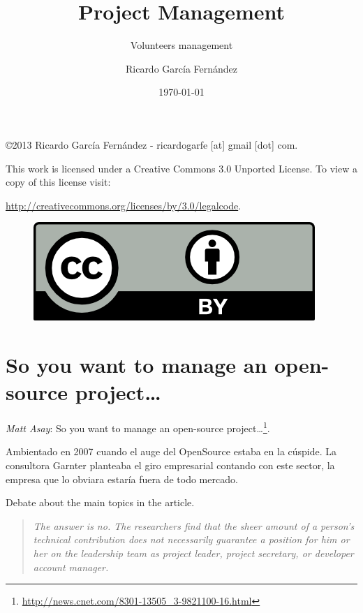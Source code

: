 \documentclass[11pt]{scrartcl}
\title{\textbf{Project Management}}
\subtitle{Volunteers management}
\author{Ricardo Garc\'ia Fern\'andez}
\date{\today}
\begin{document}
\maketitle

\vfill

\begin{flushright}
    \copyright  2013 Ricardo Garc\'ia Fern\'andez - ricardogarfe [at] gmail [dot] com.

    This work is licensed under a Creative Commons 3.0 Unported License.
    To view a copy of this license visit:
 
    \url{http://creativecommons.org/licenses/by/3.0/legalcode}.
\end{flushright}

\begin{figure}[h]
    \begin{flushright}	
        \includegraphics{by}
        \label{fig:by}
    \end{flushright}
\end{figure}

\newpage

\section{So you want to manage an open-source project\ldots}

\emph{Matt Asay}: So you want to manage an open-source project\ldots\footnote{\url{http://news.cnet.com/8301-13505_3-9821100-16.html}}.

\par Ambientado en 2007 cuando el auge del OpenSource estaba en la cúspide. La consultora Garnter planteaba el giro empresarial contando con este sector, la empresa que lo obviara estaría fuera de todo mercado.

\par Debate about the main topics in the article.

\begin{quote}
    \emph{The answer is no. The researchers find that the sheer amount of a person's technical contribution does not necessarily guarantee a position for him or her on the leadership team as project leader, project secretary, or developer account manager.}
\end{quote}
\end{document}
